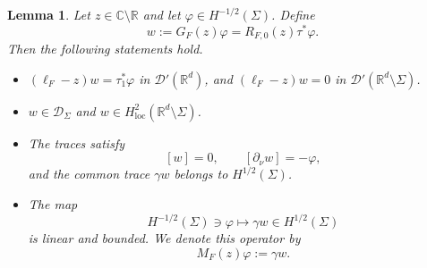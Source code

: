 \documentclass[a4paper,11pt]{article}
\numberwithin{equation}{section}
\newtheorem{lem}{Lemma}[section]
\theoremstyle{remark}
\theoremstyle{definition}
\theoremstyle{remark}
\begin{document}
\begin{lem}\label{lem:single--layer}
Let $z\in\mathbb C\setminus\mathbb R$ and let $\varphi\in H^{-1/2}(\Sigma)$.
Define
$$
w:=G_F(z)\varphi=R_{F,0}(z)\tau^*\varphi.
$$
Then the following statements hold.
\begin{itemize}
\item[(i)]
$(\ell_F-z)w=\tau_1^*\varphi$ in $\mathcal D'(\mathbb R^d)$, and $(\ell_F-z)w=0$ in $\mathcal D'(\mathbb R^d\setminus\Sigma)$.

\item[(ii)]
$w\in\mathcal D_\Sigma$ and $w\in H^2_{\mathrm{loc}}(\mathbb R^d\setminus\Sigma)$.

\item[(iii)] The traces satisfy
$$
[w]=0,\qquad [\partial_\nu w]=-\varphi,
$$
and the common trace $\gamma w$ belongs to $H^{1/2}(\Sigma)$.

\item[(iv)] The map
$$
H^{-1/2}(\Sigma)\ni\varphi
\mapsto\gamma w\in H^{1/2}(\Sigma)
$$
is linear and bounded.
We denote this operator by
$$
M_F(z)\varphi:=\gamma w.
$$
\end{itemize}
\end{lem}
\end{document}
